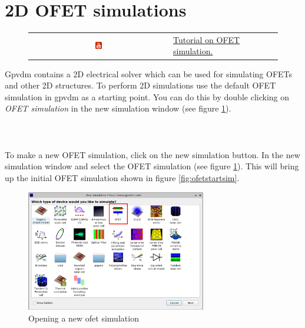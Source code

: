 \newpage
\section{2D OFET simulations}
\label{sec:ofet}

\begin{figure}[H]

\begin{tabular}{ c l }

\includegraphics[width=0.05\textwidth]{./images/youtube.png}

&
\href{https://www.youtube.com/watch?v=0RK9GEyb4HQ}{Tutorial on OFET simulation.}

\end{tabular}
\end{figure}

Gpvdm contains a 2D electrical solver which can be used for simulating OFETs and other 2D structures.  To perform 2D simulations use the default OFET simulation in gpvdm as a starting point.  You can do this by double clicking on \emph{OFET simulation} in the new simulation window (see figure \ref{fig:ofetnewsim}).
\\
\\
\\
\\




To make a new OFET simulation, click on the new simulation button. In the new simulation window and select the OFET simulation (see figure \ref{fig:ofetnewsim}).  This will bring up the initial OFET simulation shown in figure \ref{fig:ofetstartsim}.

\begin{figure}[H]
\centering
\includegraphics[width=0.7\textwidth]{./images/ofet_0.png}
\caption{Opening a new ofet simulation}
\label{fig:ofetnewsim}
\end{figure}




